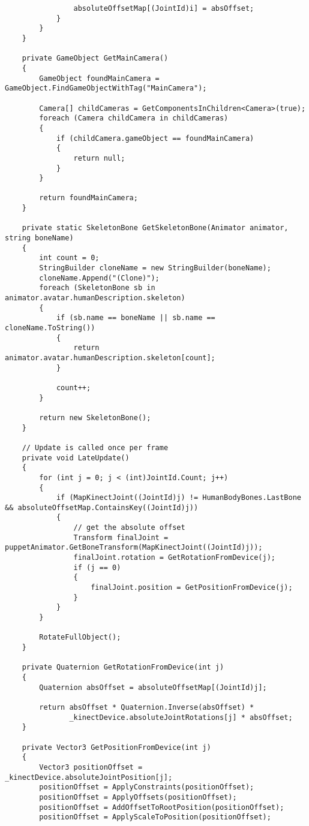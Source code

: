 \begin{verbatim}
                absoluteOffsetMap[(JointId)i] = absOffset;
            }
        }
    }

    private GameObject GetMainCamera()
    {
        GameObject foundMainCamera = GameObject.FindGameObjectWithTag("MainCamera");

        Camera[] childCameras = GetComponentsInChildren<Camera>(true);
        foreach (Camera childCamera in childCameras)
        {
            if (childCamera.gameObject == foundMainCamera)
            {
                return null;
            }
        }

        return foundMainCamera;
    }

    private static SkeletonBone GetSkeletonBone(Animator animator, string boneName)
    {
        int count = 0;
        StringBuilder cloneName = new StringBuilder(boneName);
        cloneName.Append("(Clone)");
        foreach (SkeletonBone sb in animator.avatar.humanDescription.skeleton)
        {
            if (sb.name == boneName || sb.name == cloneName.ToString())
            {
                return animator.avatar.humanDescription.skeleton[count];
            }

            count++;
        }

        return new SkeletonBone();
    }

    // Update is called once per frame
    private void LateUpdate()
    {
        for (int j = 0; j < (int)JointId.Count; j++)
        {
            if (MapKinectJoint((JointId)j) != HumanBodyBones.LastBone && absoluteOffsetMap.ContainsKey((JointId)j))
            {
                // get the absolute offset
                Transform finalJoint = puppetAnimator.GetBoneTransform(MapKinectJoint((JointId)j));
                finalJoint.rotation = GetRotationFromDevice(j);
                if (j == 0)
                {
                    finalJoint.position = GetPositionFromDevice(j);
                }
            }
        }

        RotateFullObject();
    }

    private Quaternion GetRotationFromDevice(int j)
    {
        Quaternion absOffset = absoluteOffsetMap[(JointId)j];

        return absOffset * Quaternion.Inverse(absOffset) *
               _kinectDevice.absoluteJointRotations[j] * absOffset;
    }

    private Vector3 GetPositionFromDevice(int j)
    {
        Vector3 positionOffset = _kinectDevice.absoluteJointPosition[j];
        positionOffset = ApplyConstraints(positionOffset);
        positionOffset = ApplyOffsets(positionOffset);
        positionOffset = AddOffsetToRootPosition(positionOffset);
        positionOffset = ApplyScaleToPosition(positionOffset);


\end{verbatim}
